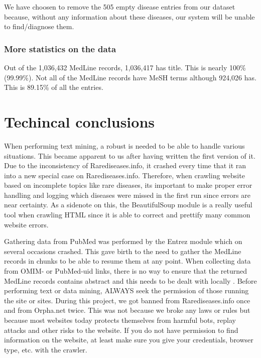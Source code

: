 We have choosen to remove the 505 empty disease entries from our
dataset because, without any information about these diseases, our
system will be unable to find/diagnose them.

\subsubsection{More statistics on the data}
Out of the 1,036,432 MedLine records, 1,036,417 has title. This is
nearly 100\% (99.99\%). Not all of the MedLine records have MeSH terms
although 924,026 has. This is 89.15\% of all the entries. 

\section{Techincal conclusions}

When performing text mining, a robust is needed to be able to handle
various situations. This became apparent to us after having written
the first version of it. Due to the inconsistency of
Rarediseases.info, it crashed every time that it ran into a new
special case on Rarediseases.info. Therefore, when crawling website
based on incomplete topics like rare diseases, its important to make
proper error handling and logging which diseases were missed in the
first run since errors are near certainty. As a sidenote on this, the
BeautifulSoup module is a really useful tool when crawling HTML since
it is able to correct and prettify many common website errors.

Gathering data from PubMed was performed by the Entrez module which on
several occasions crashed. This gave birth to the need to gather the
MedLine records in chunks to be able to resume them at any point. When
collecting data from OMIM- or PubMed-uid links, there is no way to
ensure that the returned MedLine records contains abstract and this
needs to be dealt with locally . Before
performing text or data mining, ALWAYS seek the permission of those
running the site or sites. During this project, we got banned from
Rarediseases.info once and from Orpha.net twice. This was not because
we broke any laws or rules but because most websites today protects
themselves from harmful bots, replay attacks and other risks to the
website. If you do not have permission to find information on the
website, at least make sure you give your credentials, browser type,
etc. with the crawler.

